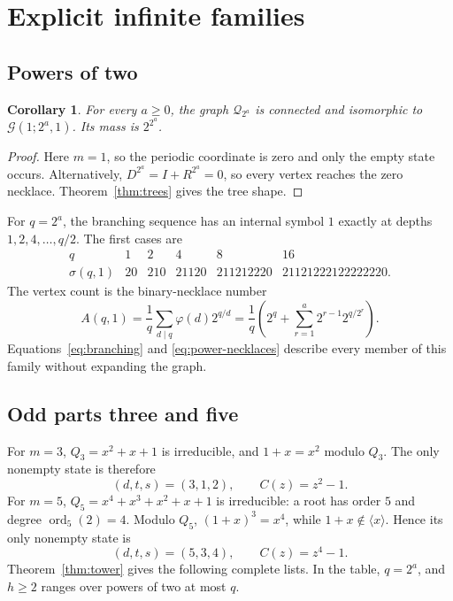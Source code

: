 \documentclass[11pt]{article}
\newtheorem{corollary}[theorem]{Corollary}
\theoremstyle{definition}
\theoremstyle{remark}
\numberwithin{equation}{section}
\newcommand{\G}{\mathcal G}
\newcommand{\Q}{\mathcal Q}
\DeclareMathOperator{\ord}{ord}
\begin{document}
\section{Explicit infinite families}\label{sec:families}

\subsection{Powers of two}

\begin{corollary}\label{cor:powers-two}
For every $a\ge0$, the graph $\Q_{2^a}$ is connected and isomorphic to
$\G(1;2^a,1)$. Its mass is $2^{2^a}$.
\end{corollary}

\begin{proof}
Here $m=1$, so the periodic coordinate is zero and only the empty state
occurs. Alternatively, $D^{2^a}=I+R^{2^a}=0$, so every vertex reaches
the zero necklace. Theorem~\ref{thm:trees} gives the tree shape.
\end{proof}

For $q=2^a$, the branching sequence has an internal symbol $1$ exactly at depths
$1,2,4,\ldots,q/2$. The first cases are
\[
 \begin{array}{c|ccccc}
 q&1&2&4&8&16\\\hline
 \sigma(q,1)&20&210&21120&211212220&21121222122222220.
 \end{array}
\]
The vertex count is the binary-necklace number
\begin{equation}\label{eq:power-necklaces}
 A(q,1)=\frac1q\sum_{d\mid q}\varphi(d)2^{q/d}
 =\frac1q\left(2^q+\sum_{r=1}^{a}2^{r-1}2^{q/2^r}\right).
\end{equation}
Equations~\eqref{eq:branching} and \eqref{eq:power-necklaces} describe
every member of this family without expanding the graph.

\subsection{Odd parts three and five}

For $m=3$, $Q_3=x^2+x+1$ is irreducible, and $1+x=x^2$ modulo $Q_3$.
The only nonempty state is therefore
\[
 (d,t,s)=(3,1,2),\qquad C(z)=z^2-1.
\]
For $m=5$, $Q_5=x^4+x^3+x^2+x+1$ is irreducible: a root has order $5$
and degree $\ord_5(2)=4$. Modulo $Q_5$,
$(1+x)^3=x^4$, while $1+x\notin\langle x\rangle$. Hence its only
nonempty state is
\[
 (d,t,s)=(5,3,4),\qquad C(z)=z^4-1.
\]
Theorem~\ref{thm:tower} gives the following complete lists. In the table,
$q=2^a$, and $h\ge2$ ranges over powers of two at most $q$.
\end{document}
